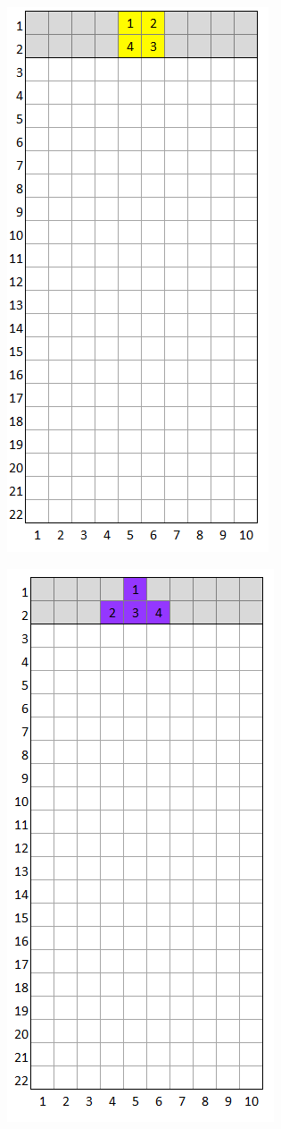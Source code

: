 \documentclass[a4paper]{article}
\begin{document}
	\begin{minipage}{0.2\textwidth}
		\centering
		\includegraphics[scale=0.4]{resources/img/minos/mino_yellow}
		\label{fig:mino-yellow}
	\end{minipage}%
	\begin{minipage}{0.2\textwidth}
		\centering
		\includegraphics[scale=0.4]{resources/img/minos/mino_purple}
		\label{fig:mino-purple}
	\end{minipage}%
\end{document}
